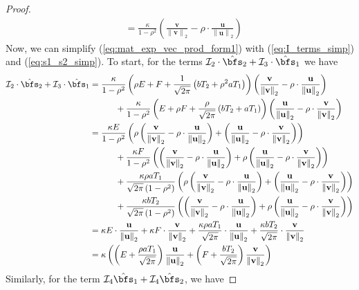 \documentclass[10pt]{article} %
\theoremstyle{definition}
\theoremstyle{plain}
\newcommand{\paren}[1]{\left(#1\right)}
\newcommand{\norm}[1]{\left\|#1\right\|}
\def\bfu{{\mathbf{u}}}\def\bfv{{\mathbf{v}}}\def\bfw{{\mathbf{w}}}\def\bfx{{\mathbf{x}}}
\begin{document}
\begin{proof}
\begin{equation}
\begin{aligned}
            & = \frac{\kappa}{1-\rho^2}\paren{\frac{\bfv}{\norm{\bfv}_2} - \rho\cdot\frac{\bfu}{\norm{\bfu}_2}}
        \end{aligned}
    \end{equation}
    Now, we can simplify (\ref{eq:mat_exp_vec_prod_form1}) with (\ref{eq:I_terms_simp}) and (\ref{eq:s1_s2_simp}). To start, for the terms $\mathcal{I}_2\cdot\hat{\bfs}_2 + \mathcal{I}_3\cdot\hat{\bfs}_1$ we have
    \begin{align*}
        \mathcal{I}_2\cdot\hat{\bfs}_2 + \mathcal{I}_3\cdot\hat{\bfs}_1 & = \frac{\kappa}{1-\rho^2}\paren{\rho E + F + \frac{1}{\sqrt{2\pi}}\paren{bT_2 + \rho^2aT_1}}\paren{\frac{\bfv}{\norm{\bfv}_2} - \rho\cdot\frac{\bfu}{\norm{\bfu}_2}}\\
        &\quad\quad\quad + \frac{\kappa}{1-\rho^2}\paren{E + \rho F + \frac{\rho}{\sqrt{2\pi}}\paren{bT_2 + aT_1}}\paren{\frac{\bfu}{\norm{\bfu}_2} - \rho\cdot \frac{\bfv}{\norm{\bfv}_2}}\\
        & = \frac{\kappa E}{1-\rho^2}\paren{\rho\paren{\frac{\bfv}{\norm{\bfv}_2} - \rho\cdot\frac{\bfu}{\norm{\bfu}_2}} + \paren{\frac{\bfu}{\norm{\bfu}_2} - \rho\cdot \frac{\bfv}{\norm{\bfv}_2}}}\\
        &\quad\quad\quad + \frac{\kappa F}{1-\rho^2}\paren{\paren{\frac{\bfv}{\norm{\bfv}_2} - \rho\cdot\frac{\bfu}{\norm{\bfu}_2}} + \rho\paren{\frac{\bfu}{\norm{\bfu}_2} - \rho\cdot \frac{\bfv}{\norm{\bfv}_2}}}\\
        & \quad\quad\quad + \frac{\kappa\rho aT_1}{\sqrt{2\pi}\paren{1-\rho^2}}\paren{\rho\paren{\frac{\bfv}{\norm{\bfv}_2} - \rho\cdot\frac{\bfu}{\norm{\bfu}_2}} + \paren{\frac{\bfu}{\norm{\bfu}_2} - \rho\cdot \frac{\bfv}{\norm{\bfv}_2}}}\\
        &\quad\quad\quad + \frac{\kappa b T_2}{\sqrt{2\pi}\paren{1-\rho^2}}\paren{\paren{\frac{\bfv}{\norm{\bfv}_2} - \rho\cdot\frac{\bfu}{\norm{\bfu}_2}} + \rho\paren{\frac{\bfu}{\norm{\bfu}_2} - \rho\cdot \frac{\bfv}{\norm{\bfv}_2}}}\\
        & = \kappa E\cdot\frac{\bfu}{\norm{\bfu}_2} + \kappa F\cdot\frac{\bfv}{\norm{\bfv}_2} + \frac{\kappa\rho a T_1}{\sqrt{2\pi}}\cdot\frac{\bfu}{\norm{\bfu}_2} + \frac{\kappa b T_2}{\sqrt{2\pi}}\cdot\frac{\bfv}{\norm{\bfv}_2}\\
        & = \kappa\paren{\paren{E + \frac{\rho a T_1}{\sqrt{2\pi}}}\frac{\bfu}{\norm{\bfu}_2} + \paren{F + \frac{b T_2}{\sqrt{2\pi}}}\frac{\bfv}{\norm{\bfv}_2}}
    \end{align*}
    Similarly, for the term $\mathcal{I}_4\hat{\bfs}_1 + \mathcal{I}_4\hat{\bfs}_2$, we have

\end{proof}
\end{document}
